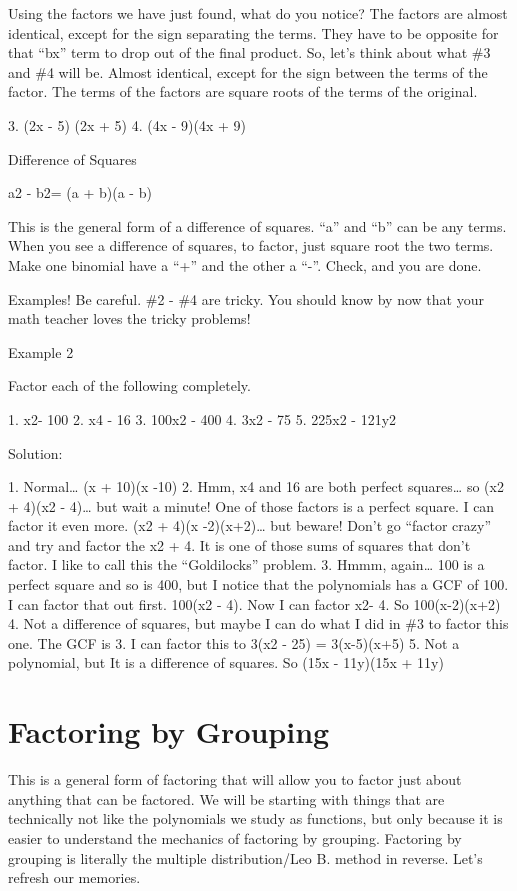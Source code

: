 Using the factors we have just found, what do you notice? The factors are almost identical, except for the sign separating the terms. They have to be opposite for that ``bx'' term to drop out of the final product. So, let's think about what \#3 and \#4 will be. Almost identical, except for the sign between the terms of the factor. The terms of the factors are square roots of the terms of the original.

3. (2x - 5) (2x + 5)
4. (4x - 9)(4x + 9)

Difference of Squares

a2 - b2= (a + b)(a - b)

This is the general form of a difference of squares. ``a'' and ``b'' can be any terms. When you see a difference of squares, to factor, just square root the two terms. Make one binomial have a ``+'' and the other a ``-''. Check, and you are done.

Examples! Be careful. \#2 - \#4 are tricky. You should know by now that your math teacher loves the tricky problems!

Example 2

Factor each of the following completely.

1. x2- 100
2. x4 - 16
3. 100x2 - 400
4. 3x2 - 75
5. 225x2 - 121y2

Solution:

1. Normal\ldots{} (x + 10)(x -10)
2. Hmm, x4 and 16 are both perfect squares\ldots{} so (x2 + 4)(x2 - 4)\ldots{} but wait a minute! One of those factors is a perfect square. I can factor it even more. (x2 + 4)(x -2)(x+2)\ldots{} but beware! Don't go ``factor crazy'' and try and factor the x2 + 4. It is one of those sums of squares that don't factor. I like to call this the ``Goldilocks'' problem.
3. Hmmm, again\ldots{} 100 is a perfect square and so is 400, but I notice that the polynomials has a GCF of 100. I can factor that out first. 100(x2 - 4). Now I can factor x2- 4. So 100(x-2)(x+2)
4. Not a difference of squares, but maybe I can do what I did in \#3 to factor this one. The GCF is 3. I can factor this to 3(x2 - 25) = 3(x-5)(x+5)
5. Not a polynomial, but It is a difference of squares. So (15x - 11y)(15x + 11y)


\section{Factoring by Grouping}

This is a general form of factoring that will allow you to factor just about anything that can be factored. We will be starting with things that are technically not like the polynomials we study as functions, but only because it is easier to understand the mechanics of factoring by grouping. Factoring by grouping is literally the multiple distribution/Leo B. method in reverse. Let's refresh our memories. 

